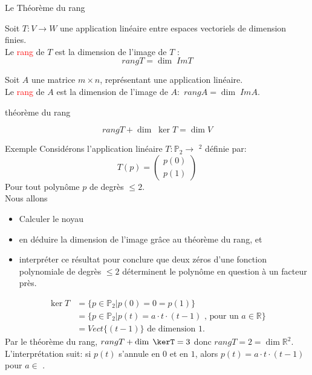 \begin{parag}{Le Théorème du rang}
\begin{definition}
Soit $T : V \to W$ une application linéaire entre espaces vectoriels de dimension finies.
\\
Le \textcolor{red}{rang} de $T$ est la dimension de l'image de $T$ : 
\[rang T = \dim \; ImT\]
\end{definition}

\begin{definition}
Soit $A$ une matrice $m \times n$, représentant une application linéaire.
\\
    Le \textcolor{red}{rang} de $A$ est la dimension de l'image de $A: $ $rangA = \dim\; ImA$.
\end{definition}
\begin{theoreme}{théorème du rang}

        \[rangT + \dim \; \ker T  = \dim V\]
    
\end{theoreme}
    \begin{subparag}{Exemple}
        Considérons l'application linéaire $T: \mathbb{P}_2 \to $ \R$^2$ définie par:
        \[T\left(p\right) = \begin{pmatrix}
            p\left(0\right) \\ p\left(1\right)
        \end{pmatrix}\]
        Pour tout polynôme $p$ de degrès $\leq 2$.
        \\
        Nous allons 
        \begin{itemize}
            \item Calculer le noyau
            \item en déduire la dimension de l'image grâce au théorème du rang, et
            \item interpréter ce résultat pour conclure que deux zéros d'une fonction polynomiale de degrès $\leq 2$ déterminent le polynôme en question à un facteur près.
        \end{itemize}

        \begin{align*}
        \ker T &= \{p \in \mathbb{P}_2 | p\left(0\right) = 0 = p\left(1\right)\}\\
            &= \{p \in \mathbb{P}_2 | p\left(t\right) = a\cdot t\cdot \left(t - 1\right) \text{ , pour un } a \in \mathbb{R}\} \\
            &= Vect\{\left(t-1\right)\} \text{ de dimension 1.}
        \end{align*}
        Par le théorème du rang, $rang T + \dim\;\kerT = 3$ donc $rang T = 2 = \dim \mathbb{R}^2$.
        \\
        L'interprétation suit: si $p\left(t\right)$ s'annule en $0$ et en $1$, alors $p\left(t\right) = a \cdot t \cdot \left(t- 1\right)$ pour $a \in $ \R.
    \end{subparag}
\end{parag}
